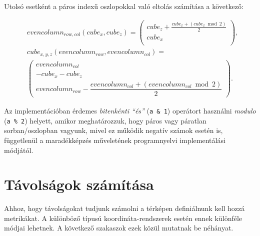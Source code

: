 %

Utolsó esetként a páros indexű oszlopokkal való eltolás számítása a következő:

\begin{align*}
&evencolumn_{row, col}(cube_{x}, cube_{z}) =
\left(
\begin{array}{c}
cube_{z} + \frac{cube_{x} + (cube_{x} \bmod 2)}{2} \\
cube_{x} \\
\end{array}
\right),
\\
&cube_{x,y,z}(evencolumn_{row}, evencolumn_{col}) = \\
&\left(
\begin{array}{c}
evencolumn_{col} \\
-cube_{x} - cube_{z} \\
evencolumn_{row} - \dfrac{evencolumn_{col} + (evencolumn_{col} \bmod 2)}{2}
\end{array}
\right).
\end{align*}

%

Az implementációban érdemes \textit{bitenkénti “és”} (\texttt{a \& 1}) operátort használni \textit{modulo} (\texttt{a \% 2}) helyett, amikor meghatározzuk, hogy páros vagy páratlan sorban/oszlopban vagyunk, mivel ez működik negatív számok esetén is, függetlenül a maradékképzés műveletének programnyelvi implementálási módjától.

\newpage
\section{Távolságok számítása}
\label{sec:tavolsag}

Ahhoz, hogy távolságokat tudjunk számolni a térképen definiálnunk kell hozzá metrikákat. A különböző típusú koordináta-rendszerek esetén ennek különféle módjai lehetnek. A következő szakaszok ezek közül mutatnak be néhányat.

